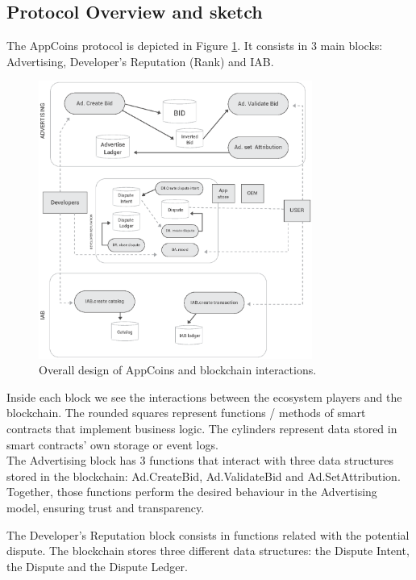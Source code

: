 \subsection{Protocol Overview and sketch}


The AppCoins protocol is depicted in Figure \ref{fig:design}. It consists in 3 main blocks: Advertising, Developer's Reputation (Rank) and IAB.

\begin{figure}[!ht]
\centering
\includegraphics[width=0.8\textwidth]{diagrams/design.eps}
\caption{Overall design of AppCoins and blockchain interactions.}
\label{fig:design}
\end{figure}

Inside each block we see the interactions between the ecosystem players and the blockchain. The rounded squares represent functions / methods of smart contracts that implement business logic. The cylinders represent data stored in smart contracts' own storage or event logs. \\

The Advertising block has 3 functions that interact with three data structures stored in the blockchain: \textsf{Ad.CreateBid}, \textsf{Ad.ValidateBid} and \textsf{Ad.SetAttribution}. Together, those functions perform the desired behaviour in the Advertising model, ensuring trust and transparency.

The Developer's Reputation block consists in functions related with the potential dispute. The blockchain stores three different data structures: the Dispute Intent, the Dispute and the Dispute Ledger.

